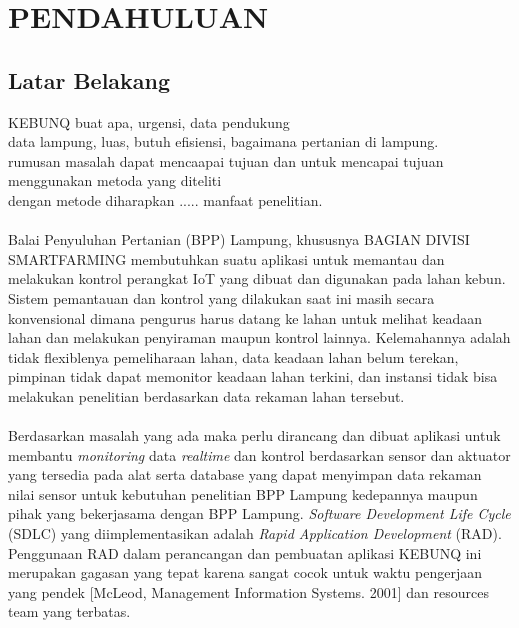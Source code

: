 \chapter{PENDAHULUAN}

\vspace{4.5pt}

\begin{flushleft}
    \section{Latar Belakang} 

\begin{justify}
  \noindent 
  
  KEBUNQ buat apa, urgensi, data pendukung\\
  data lampung, luas, butuh efisiensi, bagaimana pertanian di lampung.\\
  rumusan masalah dapat mencaapai tujuan dan untuk mencapai tujuan menggunakan metoda yang diteliti\\
  dengan metode diharapkan ..... manfaat penelitian.
  \\
  \\
  Balai Penyuluhan Pertanian (BPP) Lampung, khususnya BAGIAN DIVISI SMARTFARMING membutuhkan suatu aplikasi untuk memantau dan melakukan kontrol
  perangkat IoT yang dibuat dan digunakan pada lahan kebun. Sistem pemantauan dan kontrol yang dilakukan saat ini
  masih secara konvensional dimana pengurus harus datang ke lahan untuk melihat keadaan lahan dan melakukan penyiraman maupun kontrol lainnya. Kelemahannya adalah tidak flexiblenya pemeliharaan lahan, data keadaan lahan belum terekan,
  pimpinan tidak dapat memonitor keadaan lahan terkini, dan instansi tidak bisa melakukan penelitian berdasarkan data rekaman lahan tersebut.
  \\
  \\
  Berdasarkan masalah yang ada maka perlu dirancang dan dibuat aplikasi untuk membantu
\textit{monitoring} data \textit{realtime} dan kontrol berdasarkan sensor dan aktuator yang tersedia pada alat serta database yang dapat menyimpan data rekaman nilai sensor untuk kebutuhan
penelitian BPP Lampung kedepannya maupun pihak yang bekerjasama dengan BPP Lampung. \textit{Software Development Life Cycle} (SDLC) yang diimplementasikan adalah
\textit{Rapid Application Development} (RAD). Penggunaan RAD dalam perancangan dan pembuatan aplikasi KEBUNQ ini merupakan gagasan yang tepat karena sangat cocok untuk 
waktu pengerjaan yang pendek [McLeod, Management Information Systems. 2001] dan resources team yang terbatas.


\end{justify}
\end{flushleft}
